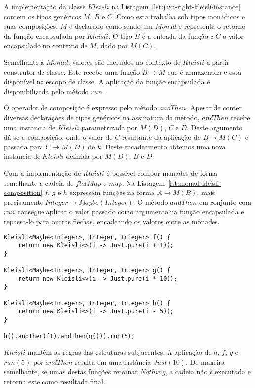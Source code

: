 \documentclass[10pt, conference]{IEEEtran}
\begin{document}
A implementação da classe $Kleisli$ na Listagem~\ref{lst:java-right-kleisli-instance} contem os tipos genéricos $M$, $B$ e $C$. Como esta trabalha sob tipos monádicos e suas composições, $M$ é declarado como sendo um $Monad$ e representa o retorno da função encapsulada por $Kleisli$. O tipo $B$ é a entrada da função e $C$ o valor encapsulado no contexto de $M$, dado por $M(C)$.

Semelhante a $Monad$, valores são incluídos no contexto de $Kleisli$ a partir construtor de classe. Este recebe uma função $B \rightarrow M$ que é armazenada e está disponível no escopo de classe. A aplicação da função encapsulada é disponibilizada pelo método $run$.

O operador de composição é expresso pelo método $andThen$. Apesar de conter diversas declarações de tipos genéricos na assinatura do método, $andThen$ recebe uma instancia de $Kleisli$ parametrizada por $M(D)$, $C$ e $D$. Deste argumento dá-se a composição, onde o valor de $C$ resultante da aplicação de $B \rightarrow M(C)$ é passada para $C \rightarrow M(D)$ de $k$. Deste encadeamento obtemos uma nova instancia de $Kleisli$ definida por $M(D)$, $B$ e $D$.

Com a implementação de $Kleisli$ é possível compor mónades de forma semelhante a cadeia de $flatMap$ e $map$. Na Listagem~\ref{lst:monad-kleisli-composition} $f$, $g$ e $h$ expressam funções na forma ${A \rightarrow M(B)}$, mais precisamente ${Integer \rightarrow Maybe(Integer)}$. O método $andThen$ em conjunto com $run$ consegue aplicar o valor passado como argumento na função encapsulada e repassa-lo para outras flechas, encadeando os valores entre as mónades.

\begin{lstlisting}[caption = {Composição monádica com $andThen$}, label = {lst:monad-kleisli-composition}]
Kleisli<Maybe<Integer>, Integer, Integer> f() {
	return new Kleisli<>(i -> Just.pure(i + 1));
}

Kleisli<Maybe<Integer>, Integer, Integer> g() {
	return new Kleisli<>(i -> Just.pure(i * 10));
}

Kleisli<Maybe<Integer>, Integer, Integer> h() {
	return new Kleisli<>(i -> Just.pure(i - 5));
}

h().andThen(f().andThen(g())).run(5);

\end{lstlisting}

$Kleisli$ mantém as regras das estruturas subjacentes. A aplicação de $h$, $f$, $g$ e $run(5)$ por $andThen$ resulta em uma instância $Just(10)$. De maneira semelhante, se umas destas funções retornar  $Nothing$, a cadeia não é executada e retorna este como resultado final.
\end{document}
